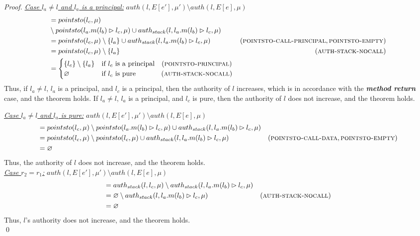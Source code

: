 \documentclass{llncs}
\begin{document}
\begin{proof}
\noindent\underline{\textit{Case $l_a \neq l$ and $l_a$ is a principal:}}
\noindent$auth(l, E[e'], \mu') \setminus auth(l, E[e], \mu)$
\vspace{-7pt}
\begin{align*}
&= pointsto(l_c, \mu)\\
& \setminus pointsto(l_a.m(l_b) \rhd l_c, \mu) \cup auth_{stack}(l, l_a.m(l_b) \rhd l_c, \mu)\\
&= pointsto(l_c, \mu) \setminus \{ l_a \} \cup auth_{stack}(l, l_a.m(l_b) \rhd l_c, \mu) & (\textsc{pointsto-call-principal}, \textsc{pointsto-empty})\\
&= pointsto(l_c, \mu) \setminus \{ l_a \} & (\textsc{auth-stack-nocall})\\
&=
\begin{cases}
    \{ l_c \} \setminus \{ l_a \} & \text{if } l_c \text{ is a principal}~~~(\textsc{pointsto-principal})\\
    \varnothing & \text{if } l_c \text{ is pure}~~~~~~~~~~~(\textsc{auth-stack-nocall})
\end{cases}
\end{align*}
Thus, if $l_a \neq l$, $l_a$ is a principal, and $l_c$ is a principal, then the authority of $l$ increases, which is in accordance with the \textbf{\textit{method return}} case, and the theorem holds. If $l_a \neq l$, $l_a$ is a principal, and $l_c$ is pure, then the authority of $l$ does not increase, and the theorem holds.

\noindent\underline{\textit{Case $l_a \neq l$ and $l_a$ is pure:}}
\noindent$auth(l, E[e'], \mu') \setminus auth(l, E[e], \mu)$
\vspace{-7pt}
\begin{align*}
&= pointsto(l_c, \mu) \setminus pointsto(l_a.m(l_b) \rhd l_c, \mu) \cup auth_{stack}(l, l_a.m(l_b) \rhd l_c, \mu)\\
&= pointsto(l_c, \mu) \setminus pointsto(l_c, \mu) \cup auth_{stack}(l, l_a.m(l_b) \rhd l_c, \mu) & (\textsc{pointsto-call-data}, \textsc{pointsto-empty})\\
&= \varnothing
\end{align*}
Thus, the authority of $l$ does not increase, and the theorem holds.\\

\noindent\underline{\underline{\textit{Case $r_2 = r_1$:}}}
$auth(l, E[e'], \mu') \setminus auth(l, E[e], \mu)$
\vspace{-7pt}
\begin{align*}
&= auth_{stack}(l, l_c, \mu) \setminus auth_{stack}(l, l_a.m(l_b) \rhd l_c, \mu)\\
&= \varnothing \setminus auth_{stack}(l, l_a.m(l_b) \rhd l_c, \mu) & (\textsc{auth-stack-nocall})\\
&= \varnothing
\end{align*}
Thus, $l$'s authority does not increase, and the theorem holds.\\
\qed
\end{proof}
\end{document}
